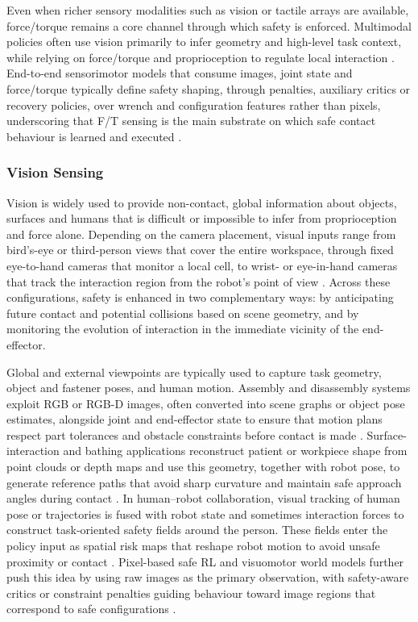 \documentclass[Afour,sageh,times]{template/sagej}
\begin{document}
Even when richer sensory modalities such as vision or tactile arrays are available, force/torque remains a core channel through which safety is enforced. Multimodal policies often use vision primarily to infer geometry and high-level task context, while relying on force/torque and proprioception to regulate local interaction \citep{9,12,31,94}. End-to-end sensorimotor models that consume images, joint state and force/torque typically define safety shaping, through penalties, auxiliary critics or recovery policies, over wrench and configuration features rather than pixels, underscoring that F/T sensing is the main substrate on which safe contact behaviour is learned and executed \citep{37,95,100}.

\subsubsection{Vision Sensing}

Vision is widely used to provide non-contact, global information about objects, surfaces and humans that is difficult or impossible to infer from proprioception and force alone. Depending on the camera placement, visual inputs range from bird’s-eye or third-person views that cover the entire workspace, through fixed eye-to-hand cameras that monitor a local cell, to wrist- or eye-in-hand cameras that track the interaction region from the robot’s point of view \citep{3,5,13,15,20,36,57,65}. Across these configurations, safety is enhanced in two complementary ways: by anticipating future contact and potential collisions based on scene geometry, and by monitoring the evolution of interaction in the immediate vicinity of the end-effector.

Global and external viewpoints are typically used to capture task geometry, object and fastener poses, and human motion. Assembly and disassembly systems exploit RGB or RGB-D images, often converted into scene graphs or object pose estimates, alongside joint and end-effector state to ensure that motion plans respect part tolerances and obstacle constraints before contact is made \citep{20,36,67,95,98}. Surface-interaction and bathing applications reconstruct patient or workpiece shape from point clouds or depth maps and use this geometry, together with robot pose, to generate reference paths that avoid sharp curvature and maintain safe approach angles during contact \citep{1,2,5,61}. In human–robot collaboration, visual tracking of human pose or trajectories is fused with robot state and sometimes interaction forces to construct task-oriented safety fields around the person. These fields enter the policy input as spatial risk maps that reshape robot motion to avoid unsafe proximity or contact \citep{15,57}. Pixel-based safe RL and visuomotor world models further push this idea by using raw images as the primary observation, with safety-aware critics or constraint penalties guiding behaviour toward image regions that correspond to safe configurations \citep{13,22,65,91}.
\end{document}
